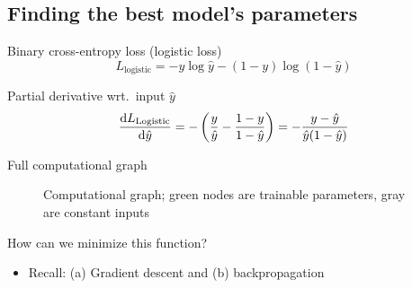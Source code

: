 \documentclass[12pt,aspectratio=169,handout]{beamer}
\begin{document}
\subsection{Finding the best model's parameters}



\begin{frame}{Binary cross-entropy loss (logistic loss)}
$$
L_{\text{logistic}} = - y \log \hat{y} - (1 - y) \log (1 - \hat{y})
$$

\begin{block}{Partial derivative wrt.\ input $\hat{y}$}
$$
\dv{L_{\text{Logistic}}}{\hat{y}} =
- \left(
\frac{y}{\hat{y}} - \frac{1 - y}{1 - \hat{y}}
\right)
=
- \frac{y - \hat{y}}{ \hat{y} (1 - \hat{y})}
$$
\end{block}

\end{frame}

\begin{frame}{Full computational graph}
\begin{figure}
	\caption{Computational graph; green nodes are trainable parameters, gray are constant inputs}
\end{figure}

How can we minimize this function?

\begin{itemize}
	\item Recall: (a) Gradient descent and (b) backpropagation
\end{itemize}

\end{frame}
\end{document}
